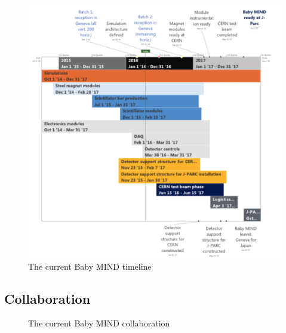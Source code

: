 \begin{figure}[h!]
\centering
\includegraphics[width=\textwidth]{figures/timeline.png}
\caption{The current Baby MIND timeline}
\label{fig:timeline}
\end{figure}


\subsection{Collaboration}

\begin{figure}[h!]
\centering
{}
\caption{The current Baby MIND collaboration}
\label{fig:collaboration}
\end{figure}

